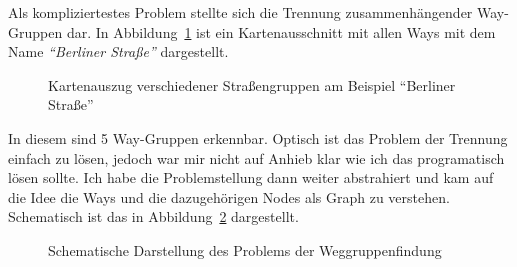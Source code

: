 Als kompliziertestes Problem stellte sich die Trennung zusammenhängender Way-Gruppen dar.
In Abbildung~\ref{fig:ose:osm_streetgroups_1} ist ein Kartenausschnitt mit allen Ways mit dem Name \textit{``Berliner Straße''} dargestellt.
\begin{figure}[htb]
   \centering
   \caption{Kartenauszug verschiedener Straßengruppen am Beispiel ``Berliner Straße''}
   \label{fig:ose:osm_streetgroups_1}
 \end{figure}
In diesem sind 5 Way-Gruppen erkennbar.
Optisch ist das Problem der Trennung einfach zu lösen, jedoch war mir nicht auf Anhieb klar wie ich das programatisch lösen sollte.
Ich habe die Problemstellung dann weiter abstrahiert und kam auf die Idee die Ways und die dazugehörigen Nodes als Graph zu verstehen. Schematisch ist das in Abbildung~\ref{fig:ose:osm_streetgroups_2} dargestellt.
\begin{figure}[htb]
   \centering
   \caption{Schematische Darstellung des Problems der Weggruppenfindung}
   \label{fig:ose:osm_streetgroups_2}
 \end{figure}
